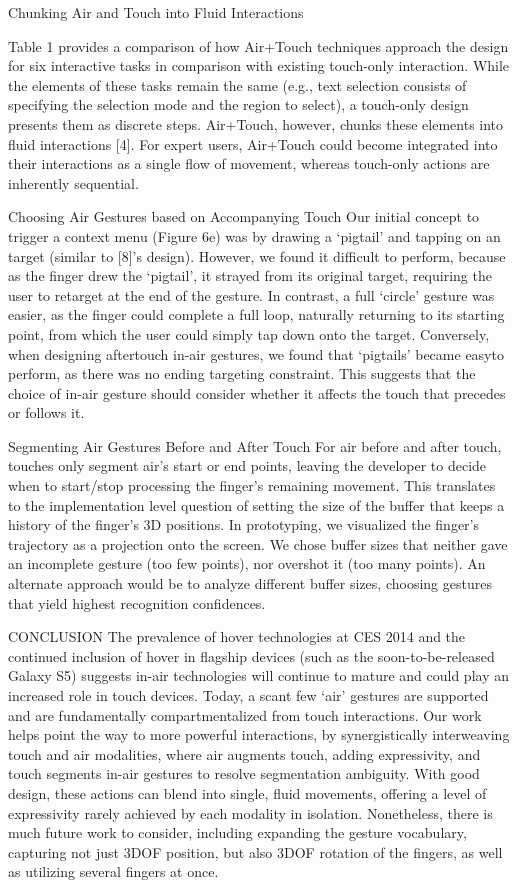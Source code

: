 Chunking Air and Touch into Fluid Interactions

Table 1 provides a comparison of how Air+Touch techniques approach the design for six interactive tasks in comparison with existing touch-only interaction. While the elements of these tasks remain the same (e.g., text selection consists of specifying the selection mode and the region to select), a touch-only design presents them as discrete steps. Air+Touch, however, chunks these elements into fluid interactions [4]. For expert users, Air+Touch could become integrated into their interactions as a single flow of movement, whereas touch-only actions are inherently sequential.

Choosing Air Gestures based on Accompanying Touch
Our initial concept to trigger a context menu (Figure 6e) was by drawing a ‘pigtail’ and tapping on an target (similar to [8]’s design). However, we found it difficult to perform, because as the finger drew the ‘pigtail’, it strayed from its original target, requiring the user to retarget at the end of the gesture. In contrast, a full ‘circle’ gesture was easier, as the finger could complete a full loop, naturally returning to its starting point, from which the user could simply tap down onto the target. Conversely, when designing aftertouch in-air gestures, we found that ‘pigtails’ became easyto perform, as there was no ending targeting constraint. This suggests that the choice of in-air gesture should consider whether it affects the touch that precedes or follows it.

Segmenting Air Gestures Before and After Touch
For air before and after touch, touches only segment air’s start or end points, leaving the developer to decide when to start/stop processing the finger’s remaining movement. This translates to the implementation level question of setting the size of the buffer that keeps a history of the finger’s 3D positions. In prototyping, we visualized the finger’s trajectory as a projection onto the screen. We chose buffer sizes that neither gave an incomplete gesture (too few points), nor overshot it (too many points). An alternate approach would be to analyze different buffer sizes, choosing gestures that yield highest recognition confidences.

CONCLUSION
The prevalence of hover technologies at CES 2014 and the continued inclusion of hover in flagship devices (such as the soon-to-be-released Galaxy S5) suggests in-air technologies will continue to mature and could play an increased role in touch devices. Today, a scant few ‘air’ gestures are supported and are fundamentally compartmentalized from touch interactions. Our work helps point the way to more powerful interactions, by synergistically interweaving touch and air modalities, where air augments touch, adding expressivity, and touch segments in-air gestures to resolve segmentation ambiguity. With good design, these actions can blend into single, fluid movements, offering a level of expressivity rarely achieved by each modality in isolation. Nonetheless, there is much future work to consider, including expanding the gesture vocabulary, capturing not just 3DOF position, but also 3DOF rotation of the fingers, as well as utilizing several fingers at once. 